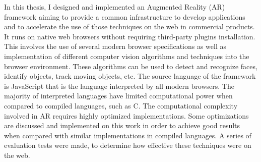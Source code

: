 In this thesis, I designed and implemented an Augmented Reality (AR) framework
aiming to provide a common infrastructure to develop applications and to accelerate the use
of those techniques on the web in commercial products.   It runs on native web
browsers without requiring third-party plugins installation. This involves the use
of several modern browser specifications as well as implementation
of different computer vision algorithms and techniques into the browser environment.
These algorithms can be used to detect and recognize faces, identify objects,
track moving objects, etc.  The source language of the framework is JavaScript
that is the language interpreted by all modern browsers.   The majority of
interpreted languages have limited computational power when compared to compiled
languages, such as C. The computational complexity involved in AR requires highly
optimized implementations. Some optimizations are discussed and implemented on this work in order to achieve good results when compared with similar implementations in compiled languages.  A series of evaluation tests were made, to determine how effective these techniques were on the web.


